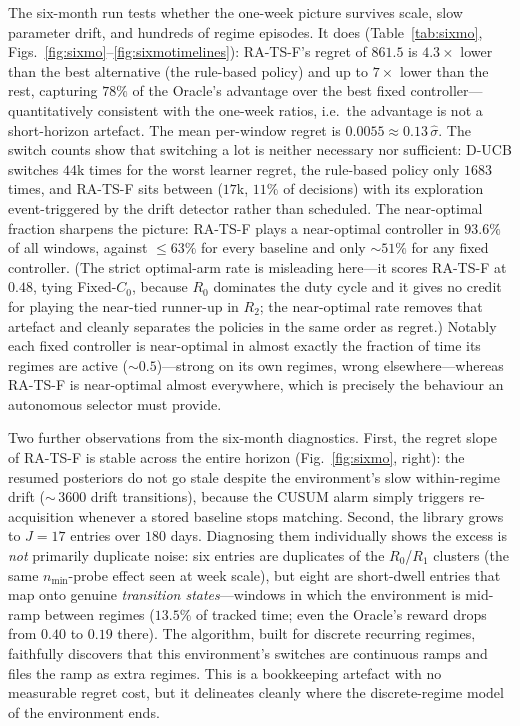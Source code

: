 \documentclass[11pt,a4paper]{article}
\newcommand{\Cz}{C_{0}}
\begin{document}
The six-month run tests whether the one-week picture survives scale, slow
parameter drift, and hundreds of regime episodes. It does
(Table~\ref{tab:sixmo}, Figs.~\ref{fig:sixmo}--\ref{fig:sixmotimelines}):
RA-TS-F's regret of $861.5$ is $4.3\times$ lower than the best alternative
(the rule-based policy) and up to $7\times$ lower than the rest, capturing
$78\%$ of the Oracle's advantage over the best fixed controller---%
quantitatively consistent with the one-week ratios, i.e.\ the advantage is not
a short-horizon artefact. The mean per-window regret is $0.0055 \approx
0.13\,\hat\sigma$. The switch counts show that switching a lot is neither
necessary nor sufficient: D-UCB switches $44$k times for the worst learner
regret, the rule-based policy only $1683$ times, and RA-TS-F sits between
($17$k, $11\%$ of decisions) with its exploration event-triggered by the
drift detector rather than scheduled. The near-optimal fraction sharpens the
picture: RA-TS-F plays a near-optimal controller in $93.6\%$ of all windows,
against $\le 63\%$ for every baseline and only $\sim 51\%$ for any fixed
controller. (The strict optimal-arm rate is misleading here---it scores
RA-TS-F at $0.48$, tying Fixed-$\Cz$, because $R_0$ dominates the duty cycle
and it gives no credit for playing the near-tied runner-up in $R_2$; the
near-optimal rate removes that artefact and cleanly separates the policies in
the same order as regret.) Notably each fixed controller is near-optimal in
almost exactly the fraction of time its regimes are active
($\sim 0.5$)---strong on its own regimes, wrong elsewhere---whereas RA-TS-F is
near-optimal almost everywhere, which is precisely the behaviour an
autonomous selector must provide.

Two further observations from the six-month diagnostics. First, the regret
slope of RA-TS-F is stable across the entire horizon
(Fig.~\ref{fig:sixmo}, right): the resumed posteriors do not go stale despite
the environment's slow within-regime drift ($\sim$\,$3600$ drift transitions),
because the CUSUM alarm simply triggers re-acquisition whenever a stored
baseline stops matching. Second, the library grows to $J=17$ entries over
$180$ days. Diagnosing them individually shows the excess is \emph{not}
primarily duplicate noise: six entries are duplicates of the $R_0$/$R_1$
clusters (the same $n_{\min}$-probe effect seen at week scale), but eight are
short-dwell entries that map onto genuine \emph{transition states}---windows in
which the environment is mid-ramp between regimes ($13.5\%$ of tracked time;
even the Oracle's reward drops from $0.40$ to $0.19$ there). The algorithm, built
for discrete recurring regimes, faithfully discovers that this environment's
switches are continuous ramps and files the ramp as extra regimes. This is a
bookkeeping artefact with no measurable regret cost, but it delineates cleanly
where the discrete-regime model of the environment ends.
\end{document}
